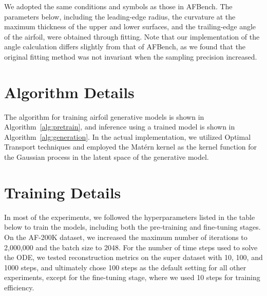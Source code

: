 We adopted the same conditions and symbols as those in AFBench. The parameters below, including the leading-edge radius, the curvature at the maximum thickness of the upper and lower surfaces, and the trailing-edge angle of the airfoil, were obtained through fitting. Note that our implementation of the angle calculation differs slightly from that of AFBench, as we found that the original fitting method was not invariant when the sampling precision increased.

\section{Algorithm Details}\label{sec:appendix_algorithm}
The algorithm for training airfoil generative models is shown in Algorithm~\ref{alg:pretrain}, and inference using a trained model is shown in Algorithm~\ref{alg:generation}. In the actual implementation, we utilized Optimal Transport techniques and employed the Matérn kernel as the kernel function for the Gaussian process in the latent space of the generative model.

\section{Training Details}
\label{app:hyper}

In most of the experiments, we followed the hyperparameters listed in the table below to train the models, including both the pre-training and fine-tuning stages. On the AF-200K dataset, we increased the maximum number of iterations to 2,000,000 and the batch size to 2048. For the number of time steps used to solve the ODE, we tested reconstruction metrics on the super dataset with 10, 100, and 1000 steps, and ultimately chose 100 steps as the default setting for all other experiments, except for the fine-tuning stage, where we used 10 steps for training efficiency.
